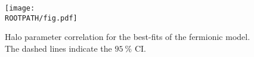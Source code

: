 \begin{figure}%
	\centering%
	\texttt{[image: \\ROOTPATH/fig.pdf]}%
	\caption{Halo parameter correlation for the best-fits of the fermionic model. The dashed lines indicate the $\SI{95}{\percent}$ CI.}%
\label{fig:parameter-correlction:core-halo}
\end{figure}
